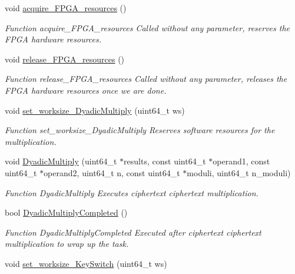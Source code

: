 \begin{DoxyCompactItemize}
\item 
void \hyperlink{namespaceintel_1_1hexl_a6236e14eaac1602475c5f4e0a42754fe}{acquire\-\_\-\-F\-P\-G\-A\-\_\-resources} ()
\begin{DoxyCompactList}\small\item\em Function acquire\-\_\-\-F\-P\-G\-A\-\_\-resources Called without any parameter, reserves the F\-P\-G\-A hardware resources. \end{DoxyCompactList}\item 
void \hyperlink{namespaceintel_1_1hexl_a717589c6dbfa6429b61e42c620d72d89}{release\-\_\-\-F\-P\-G\-A\-\_\-resources} ()
\begin{DoxyCompactList}\small\item\em Function release\-\_\-\-F\-P\-G\-A\-\_\-resources Called without any parameter, releases the F\-P\-G\-A hardware resources once we are done. \end{DoxyCompactList}\item 
void \hyperlink{namespaceintel_1_1hexl_a0721fea3151425a86da2201107e3ddcc}{set\-\_\-worksize\-\_\-\-Dyadic\-Multiply} (uint64\-\_\-t ws)
\begin{DoxyCompactList}\small\item\em Function set\-\_\-worksize\-\_\-\-Dyadic\-Multiply Reserves software resources for the multiplication. \end{DoxyCompactList}\item 
void \hyperlink{namespaceintel_1_1hexl_ae4e26f2cb97a43a2b81fe8643b6edf17}{Dyadic\-Multiply} (uint64\-\_\-t $\ast$results, const uint64\-\_\-t $\ast$operand1, const uint64\-\_\-t $\ast$operand2, uint64\-\_\-t n, const uint64\-\_\-t $\ast$moduli, uint64\-\_\-t n\-\_\-moduli)
\begin{DoxyCompactList}\small\item\em Function Dyadic\-Multiply Executes ciphertext ciphertext multiplication. \end{DoxyCompactList}\item 
bool \hyperlink{namespaceintel_1_1hexl_a638ef00009ae573955d1138b9fb03363}{Dyadic\-Multiply\-Completed} ()
\begin{DoxyCompactList}\small\item\em Function Dyadic\-Multiply\-Completed Executed after ciphertext ciphertext multiplication to wrap up the task. \end{DoxyCompactList}\item 
void \hyperlink{namespaceintel_1_1hexl_a8ac8866d0693f8fc89f99a9197cd04cf}{set\-\_\-worksize\-\_\-\-Key\-Switch} (uint64\-\_\-t ws)

\end{DoxyCompactItemize}
